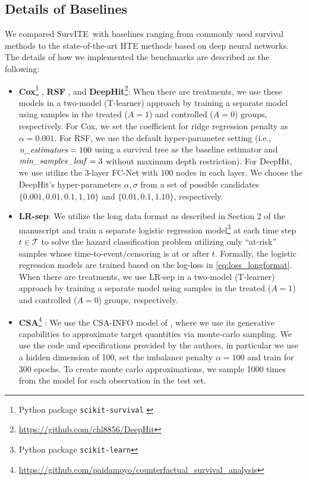 \documentclass{article}
\newcommand{\Tc}{{\mathcal T}}
\newcommand{\proposed}{{SurvITE}}
\begin{document}
\subsection{Details of Baselines}
We compared \proposed~with baselines ranging from commonly used survival methods to the state-of-the-art HTE methods based on deep neural networks. The details of how we implemented the benchmarks are described as the following:
\begin{itemize}[leftmargin=5.5mm]
    \item \textbf{Cox}\footnote{Python package \texttt{scikit-survival} \cite{sksurv} \label{footnote:sksurv}} \cite{Cox:72}, \textbf{RSF} \cite{Ishwaran:08}, {and \textbf{DeepHit}\footnote{\url{https://github.com/chl8856/DeepHit}}}: When there are treatments, we use these models in a two-model (T-learner) approach by training a separate model using samples in the treated ($A=1$) and controlled ($A=0$) groups, respectively. For Cox, we set the coefficient for ridge regression penalty as $\alpha=0.001$. For RSF, we use the default hyper-parameter setting (i.e., $\text{\textit{n\_estimators}}=100$ using a survival tree as the baseline estimator and $\text{\textit{min\_samples\_leaf}}=3$ without maximum depth restriction). {For DeepHit, we use utilize the 3-layer FC-Net with 100 nodes in each layer. We choose the DeepHit's hyper-parameters $\alpha, \sigma$ from a set of possible candidates $\{0.001, 0.01, 0.1, 1, 10\}$ and $\{0.01, 0.1, 1. 10\}$, respectively.}
    \item \textbf{LR-sep}: We utilize the long data format as described in Section 2 of the manuscript and train a separate logistic regression model\footnote{Python package \texttt{scikit-learn}} at each time step $t\in\Tc$ to solve the hazard classification problem utilizing only ``at-risk'' samples whose time-to-event/censoring is at or after $t$. Formally, the logistic regression models are trained based on the log-loss in \eqref{eq:loss_longformat}. When there are treatments, we use LR-sep in a two-model (T-learner) approach by training a separate model using samples in the treated ($A=1$) and controlled ($A=0$) groups, respectively. 
    \item\textbf{CSA}\footnote{\url{https://github.com/paidamoyo/counterfactual_survival_analysis}} \cite{chapfuwa2021enabling}: We use the CSA-INFO model of \cite{chapfuwa2021enabling}, where we use its generative capabilities to approximate target quantities via monte-carlo sampling. We use the code and specifications provided by the authors, in particular we use a hidden dimension of 100, set the imbalance penalty $\alpha=100$ and train for 300 epochs. To create monte carlo approximations, we sample 1000 times from the model for each observation in the test set.  

\end{itemize}
\end{document}
